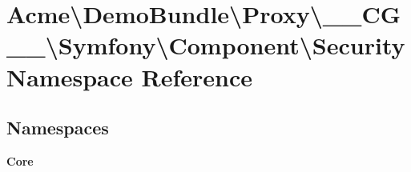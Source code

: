 \section{Acme\textbackslash{}Demo\+Bundle\textbackslash{}Proxy\textbackslash{}\+\_\+\+\_\+\+C\+G\+\_\+\+\_\+\textbackslash{}Symfony\textbackslash{}Component\textbackslash{}Security Namespace Reference}
\label{namespace_acme_1_1_demo_bundle_1_1_proxy_1_1_____c_g_____1_1_symfony_1_1_component_1_1_security}
\subsection*{Namespaces}
\begin{DoxyCompactItemize}
\item 
 {\bf Core}
\end{DoxyCompactItemize}
